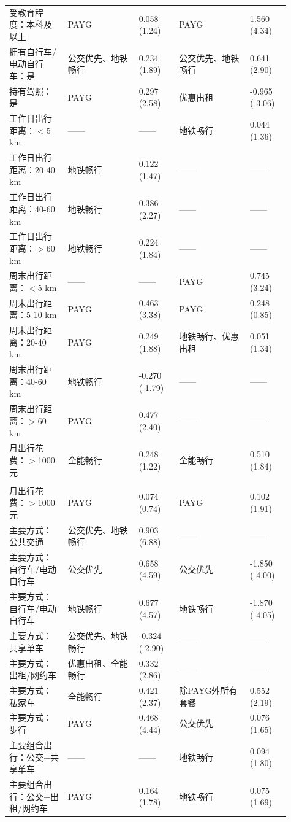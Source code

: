 \begin{landscape}
{\begin{longtable}{L{0.19\linewidth}L{0.23\linewidth}C{0.13\linewidth}L{0.23\linewidth}C{0.13\linewidth}}
受教育程度：本科及以上 & PAYG & 0.058 (1.24) & PAYG & 1.560 (4.34) \\
拥有自行车/电动自行车：是 & 公交优先、地铁畅行 & 0.234 (1.89) & 公交优先、地铁畅行 & 0.641 (2.90) \\
持有驾照：是 & PAYG & 0.297 (2.58) & 优惠出租 & -0.965 (-3.06) \\
工作日出行距离：$<$5 km & —— & —— & 地铁畅行 & 0.044 (1.36) \\
工作日出行距离：20-40 km & 地铁畅行 & 0.122 (1.47) & —— & —— \\
工作日出行距离：40-60 km & 地铁畅行 & 0.386 (2.27) & —— & —— \\
工作日出行距离：$>$60 km & 地铁畅行 & 0.224 (1.84) & —— & —— \\
周末出行距离：$<$5 km & —— & —— & PAYG & 0.745 (3.24) \\
周末出行距离：5-10 km & PAYG & 0.463 (3.38) & PAYG & 0.248 (0.85) \\
周末出行距离：20-40 km & PAYG & 0.249 (1.88) & 地铁畅行、优惠出租 & 0.051 (1.34) \\
周末出行距离：40-60 km & 地铁畅行 & -0.270 (-1.79) & —— & —— \\
周末出行距离：$>$60 km & PAYG & 0.477 (2.40) & —— & —— \\
月出行花费：$>$1000 元 & 全能畅行 & 0.248 (1.22) & 全能畅行 & 0.510 (1.84) \\
\pagebreak
{} \\*
月出行花费：$>$1000 元 & PAYG & 0.074 (0.74) & PAYG & 0.102 (1.91) \\
主要方式：公共交通 & 公交优先、地铁畅行 & 0.903 (6.88) & —— & —— \\
主要方式：自行车/电动自行车 & 公交优先 & 0.658 (4.59) & 公交优先 & -1.850 (-4.00) \\
主要方式：自行车/电动自行车 & 地铁畅行 & 0.677 (4.57) & 地铁畅行 & -1.870 (-4.05) \\
主要方式：共享单车 & 公交优先、地铁畅行 & -0.324 (-2.90) & —— & —— \\
主要方式：出租/网约车 & 优惠出租、全能畅行 & 0.332 (2.86) & —— & —— \\
主要方式：私家车 & 全能畅行 & 0.421 (2.37) & 除PAYG外所有套餐 & 0.552 (2.19) \\
主要方式：步行 & PAYG & 0.468 (4.44) & 公交优先 & 0.076 (1.65) \\
主要组合出行：公交+共享单车 & —— & —— & 地铁畅行 & 0.094 (1.80) \\
主要组合出行：公交+出租/网约车 & PAYG & 0.164 (1.78) & 地铁畅行 & 0.075 (1.69) \\

\end{longtable}}
\end{landscape}
